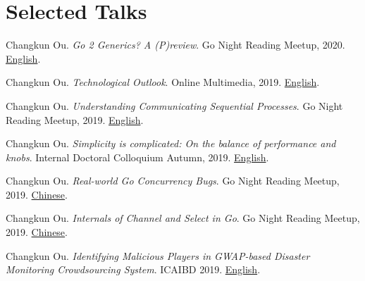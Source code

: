 \section{\textbf{Selected Talks}}
\resumeSubHeadingListStart
    \item{
      Changkun Ou.
      \emph{Go 2 Generics? A (P)review}.
      Go Night Reading Meetup, 2020. \href{https://github.com/changkun/talks/blob/master/202003/go2generics.pdf}{English}.
    }
    \item{
      Changkun Ou.
      \emph{Technological Outlook}.
      Online Multimedia, 2019. \href{https://github.com/changkun/talks/blob/master/201912/omm9.pdf}{English}.
    }
    \item{
      Changkun Ou.
      \emph{Understanding Communicating Sequential Processes}.
      Go Night Reading Meetup, 2019. \href{https://github.com/changkun/talks/blob/master/201911/csp.pdf}{English}.
    }
    \item{
      Changkun Ou.
      \emph{Simplicity is complicated: On the balance of performance and knobs}.
      Internal Doctoral Colloquium Autumn, 2019. \href{https://github.com/changkun/talks/blob/master/201910/knobs.pdf}{English}.
    }
    \item{
      Changkun Ou.
      \emph{Real-world Go Concurrency Bugs}.
      Go Night Reading Meetup, 2019. \href{https://github.com/changkun/talks/blob/master/201908/channel.pdf}{Chinese}.
    }
    \item{
      Changkun Ou.
      \emph{Internals of Channel and Select in Go}.
      Go Night Reading Meetup, 2019. \href{https://github.com/changkun/talks/blob/master/201908/channel.pdf}{Chinese}.
    }
    \item{
      Changkun Ou.
      \emph{Identifying Malicious Players in GWAP-based Disaster Monitoring Crowdsourcing System}.
      ICAIBD 2019. \href{https://github.com/changkun/talks/blob/master/201905/gwap.pdf}{English}.
    }
